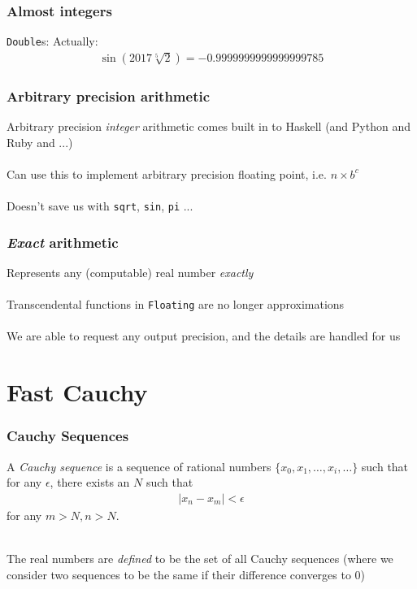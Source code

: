 \documentclass[11pt]{beamer}
\begin{document}
\begin{frame}
\frametitle{Almost integers}
\texttt{Double}s:
\pause
Actually:
\begin{align*}
\sin(2017 \sqrt[5]{2}) = -0.9999999999999999785
\end{align*}
\end{frame}

\begin{frame}
\frametitle{Arbitrary precision arithmetic}
Arbitrary precision \emph{integer} arithmetic comes built in to
Haskell (and Python and Ruby and ...)
\\~\\
Can use this to implement arbitrary precision floating point, i.e. $n
\times b^c$
\\~\\
Doesn't save us with \texttt{sqrt}, \texttt{sin}, \texttt{pi} ...
\end{frame}

\begin{frame}
\frametitle{\emph{Exact} arithmetic}
Represents any (computable) real number \emph{exactly}
\\~\\
Transcendental functions in \texttt{Floating} are no longer approximations
\\~\\
We are able to request any output precision, and the details are
handled for us
\end{frame}

\section{Fast Cauchy}

\begin{frame}
\frametitle{Cauchy Sequences}
\begin{definition}
A \emph{Cauchy sequence} is a sequence of rational numbers $\{x_0, x_1, \dots, x_i, \dots\}$
such that for any $\epsilon$, there exists an $N$ such that
\begin{align*}
\vert x_n - x_m \vert < \epsilon
\end{align*}
for any $m > N, n > N$.
\end{definition}
~\\
The real numbers are \emph{defined} to be the set of all Cauchy
sequences (where we consider two sequences to be the same if their
difference converges to $0$)
\end{frame}
\end{document}
